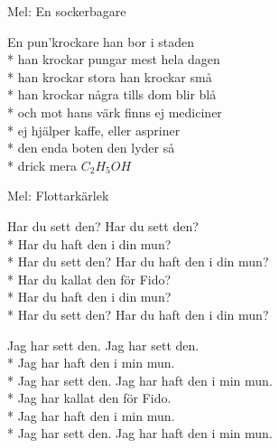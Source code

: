 \begin{SongText}
    \begin{SongInfo}
        Mel: En sockerbagare
    \end{SongInfo}
    \begin{SongVerse}
        En pun’krockare han bor i staden\\*%
        han krockar pungar mest hela dagen\\*%
        han krockar stora han krockar små\\*%
        han krockar några tills dom blir blå\\*%
        och mot hans värk finns ej mediciner\\*%
        ej hjälper kaffe, eller aspriner\\*%
        den enda boten den lyder så\\*%
        drick mera $C_2H_5OH$
    \end{SongVerse}
\end{SongText}
\begin{SongText}[Fido]
    \begin{SongInfo}
        Mel: Flottarkärlek
    \end{SongInfo}
    \begin{SongVerse}
        Har du sett den? Har du sett den?\\*%
        Har du haft den i din mun?\\*%
        Har du sett den? Har du haft den i din mun?\\*%
        Har du kallat den för Fido?\\*%
        Har du haft den i din mun?\\*%
        Har du sett den? Har du haft den i din mun?
    \end{SongVerse}
    \begin{SongVerse}
        Jag har sett den. Jag har sett den.\\*%
        Jag har haft den i min mun.\\*%
        Jag har sett den. Jag har haft den i min mun.\\*%
        Jag har kallat den för Fido.\\*%
        Jag har haft den i min mun.\\*%
        Jag har sett den. Jag har haft den i min mun.
    \end{SongVerse}
\end{SongText}
